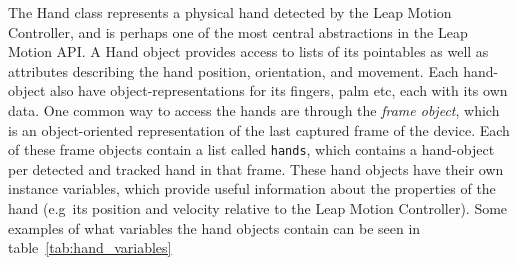 The Hand class represents a physical hand detected by the Leap Motion Controller, and is perhaps one of the most central abstractions in the Leap Motion API. 
A Hand object provides access to lists of its pointables as well as attributes describing the hand position, orientation, and movement.
Each hand-object also have object-representations for its fingers, palm etc, each with its own data.
One common way to access the hands are through the \textit{frame object}, which is an object-oriented representation of the last captured frame of the device.
Each of these frame objects contain a list called \texttt{hands}, which contains a hand-object per detected and tracked hand in that frame.
These hand objects have their own instance variables, which provide useful information about the properties of the hand (e.g~its position and velocity relative to the Leap Motion
Controller). Some examples of what variables the hand objects contain can be seen in table~\vref{tab:hand_variables}


